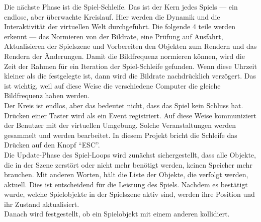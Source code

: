 \documentclass[
  10pt,
  a4paper,
  oneside,
  headers,
  headinclude,
  footinclude,
  BCOR5mm,
]{article}
\begin{document}
Die nächste Phase ist die Spiel-Schleife. Das ist der Kern jedes Spiels --- ein
endlose, aber überwachte Kreislauf. Hier werden die Dynamik und die
Interaktivität der virtuellen Welt durchgeführt. Die folgende 4 teile werden
erkennt --- das Normieren von der Bildrate, eine Prüfung auf Ausfahrt,
Aktualisieren der Spielszene und Vorbereiten den Objekten zum Rendern und das
Rendern der Änderungen. Damit die Bildfrequenz normieren können, wird die Zeit
der Rahmen für ein Iteration der Spiel-Schleife gefunden. Wenn diese Uhrzeit
kleiner als die festgelegte ist, dann wird die Bildrate nachdrücklich verzögert.
Das ist wichtig, weil auf diese Weise die verschiedene Computer die gleiche
Bildfrequenz haben werden. \\
Der Kreis ist endlos, aber das bedeutet nicht, dass das Spiel kein Schluss hat.
Drücken einer Taster wird als ein Event registriert. Auf diese Weise
kommuniziert der Benutzer mit der virtuellen Umgebung. Solche Veranstaltungen
werden gesammelt und werden bearbeitet. In diesem Projekt bricht die Schleife
das Drücken auf den Knopf ``ESC''. \\
Die Update-Phase des Spiel-Loops wird zunächst sichergestellt, dass alle
Objekte, die in der Szene zerstört oder nicht mehr benötigt werden, keinen
Speicher mehr brauchen. Mit anderen Worten, hält die Liste der Objekte, die
verfolgt werden, aktuell. Dies ist entscheidend für die Leistung des Spiels.
Nachdem es bestätigt wurde, welche Spielobjekte in der Spielszene aktiv sind,
werden ihre Position und ihr Zustand aktualisiert. \\
Danach wird festgestellt, ob ein Spielobjekt mit einem anderen kollidiert.
\end{document}
